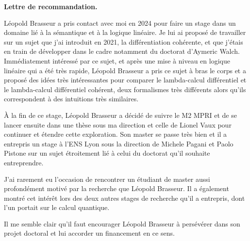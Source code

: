 \documentclass[12pt,pdftex]{letter}
\begin{document}
 \address{\vspace*{2cm}\\
 }

\signature{
\vspace{-2cm}
\texttt{[image: s4.jpg]}\\
Thomas Ehrhard\\ 
Directeur de recherche au CNRS\\
IRIF, UMR 8243
}

\begin{letter}{}

\newcommand\Name{Léopold Brasseur}
\newcommand\Fname{Brasseur}
\newcommand\Pname{Léopold}


\opening{\textbf{Lettre de recommandation.}}

\Name{} a pris contact avec moi en 2024 pour faire un stage dans un
domaine lié à la sémantique et à la logique linéaire.
%
Je lui ai proposé de travailler sur un sujet que j'ai introduit en
2021, la différentiation cohérente, et que j'étais en train de développer
dans le cadre notamment du doctorat d'Aymeric Walch.
%
Immédiatement intéressé par ce sujet, et après une mise à niveau en
logique linéaire qui a été très rapide, \Name{} a pris ce sujet à bras
le corps et a proposé des idées très intéressantes pour comparer le
lambda-calcul différentiel et le lambda-calcul différentiel cohérent,
deux formalismes très différents alors qu'ils correspondent à des
intuitions très similaires.

À la fin de ce stage, \Name{} a décidé de suivre le M2 MPRI et de se
lancer ensuite dans une thèse sous ma direction et celle de Lionel
Vaux pour continuer et étendre cette exploration.
%
Son master se passe très bien et il a entrepris un stage à l'ENS Lyon
sous la direction de Michele Pagani et Paolo Pistone sur un sujet
étroitement lié à celui du doctorat qu'il souhaite entreprendre.

J'ai rarement eu l'occasion de rencontrer un étudiant de master aussi
profondément motivé par la recherche que \Name{}.
%
Il a également montré cet intérêt lors des deux autres stages de
recherche qu'il a entrepris, dont l'un portait sur le calcul
quantique.
%


Il me semble clair qu'il faut encourager \Name{} à
persévérer dans son projet doctoral et lui accorder un financement en
ce sens.



  \closing{\ }

\end{letter}
\end{document}
